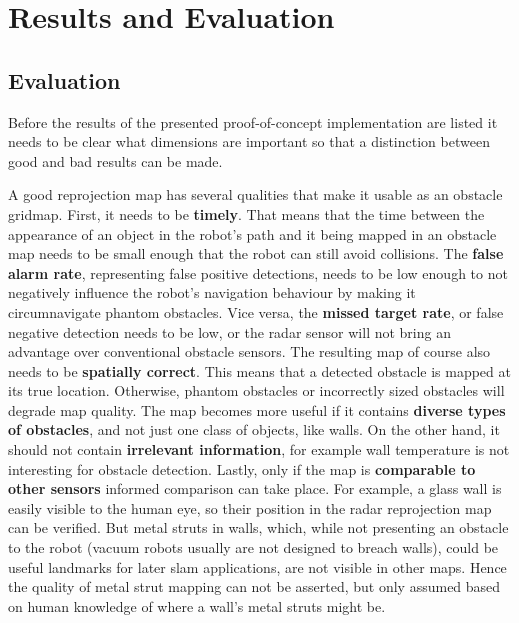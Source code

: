 \chapter{Results and Evaluation}\label{results-and-evaluation}

\section{Evaluation}\label{evaluation}

Before the results of the presented proof-of-concept implementation are listed it needs to be clear what dimensions are important so that a distinction between good and bad results can be made.

A good reprojection map has several qualities that make it usable as an obstacle gridmap. First, it needs to be \textbf{timely}. That means that the time between the appearance of an object in the robot's path and it being mapped in an obstacle map needs to be small enough that the robot can still avoid collisions. The \textbf{false alarm rate}, representing false positive detections, needs to be low enough to not negatively influence the robot's navigation behaviour by making it circumnavigate phantom obstacles. Vice versa, the \textbf{missed target rate}, or false negative detection needs to be low, or the radar sensor will not bring an advantage over conventional obstacle sensors. The resulting map of course also needs to be \textbf{spatially correct}. This means that a detected obstacle is mapped at its true location. Otherwise, phantom obstacles or incorrectly sized obstacles will degrade map quality. The map becomes more useful if it contains \textbf{diverse types of obstacles}, and not just one class of objects, like walls. On the other hand, it should not contain \textbf{irrelevant information}, for example wall temperature is not interesting for obstacle detection. Lastly, only if the map is \textbf{comparable to other sensors} informed comparison can take place. For example, a glass wall is easily visible to the human eye, so their position in the radar reprojection map can be verified. But metal struts in walls, which, while not presenting an obstacle to the robot (vacuum robots usually are not designed to breach walls), could be useful landmarks for later slam applications, are not visible in other maps. Hence the quality of metal strut mapping can not be asserted, but only assumed based on human knowledge of where a wall's metal struts might be.

